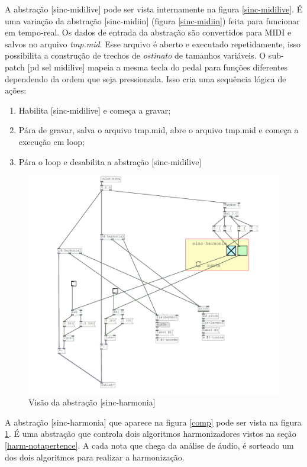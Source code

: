 \documentclass[draft]{ppgmus}
\begin{document}
A abstração [sinc-midilive] pode ser vista internamente na figura \ref{sinc-midilive}. É uma 
variação da abstração [sinc-midiin] (figura \ref{sinc-midiin}) feita para funcionar em tempo-real.
Os dados de entrada da abstração são convertidos para MIDI e salvos no arquivo \textit{tmp.mid}.
Esse arquivo é aberto e executado repetidamente, isso possibilita a construção de trechos de 
\textit{ostinato} de tamanhos variáveis. O sub-patch [pd sel midilive] mapeia a mesma tecla do
pedal para funções diferentes dependendo da ordem que seja pressionada. Isso cria uma sequência
lógica de ações:

\begin{enumerate}
 \item Habilita [sinc-midilive] e começa a  gravar;
 \item Pára de gravar, salva o arquivo tmp.mid, abre o arquivo tmp.mid e começa a execução em loop;
 \item Pára o loop e desabilita a abstração [sinc-midilive]
\end{enumerate}


\begin{figure}
\includegraphics[scale=.5]{sinc-harmonia}
\caption{Visão da abstração [sinc-harmonia]}
\label{sinc-harmonia}
\end{figure}

A abstração [sinc-harmonia] que aparece na figura \ref{comp} pode ser vista na
figura \ref{sinc-harmonia}. É uma abstração que controla dois algoritmos harmonizadores
vistos na seção \ref{harm-notapertence}. A cada nota que chega da análise de áudio, é sorteado
um dos dois algoritmos para realizar a harmonização.
\end{document}
